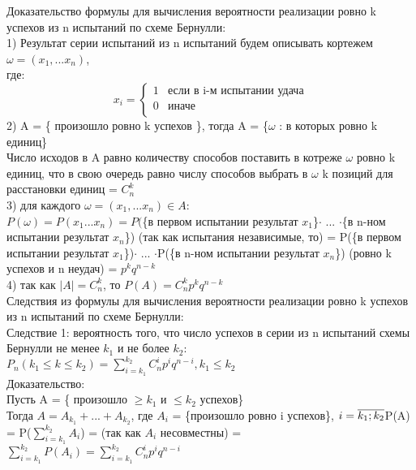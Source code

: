 Доказательство формулы для вычисления вероятности реализации ровно k успехов из n испытаний по схеме Бернулли:\\
1) Результат серии испытаний из n испытаний будем описывать кортежем $\omega = (x_{1}, ... x_{n})$,\\
где:\\
\begin{equation}
x_{i} = 
 \begin{cases}
   1 & \text{если в i-м испытании удача}\\
   0 & \text{иначе}\\
 \end{cases}
\end{equation}
2) A = \{ произошло ровно k успехов \}, тогда A = \{$\omega$ : в которых ровно k единиц\}\\
Число исходов в A равно количеству способов поставить в котреже $\omega$ ровно k единиц, что в свою очередь равно числу способов выбрать в $\omega$ k позиций для расстановки единиц = $C^{k}_{n}$\\
3) для каждого $\omega = (x_{1}, ... x_{n}) \in A$:\\
$P(\omega) = P(x_{1} ... x_{n}) = P($\{в первом испытании результат $x_{1}$\}$\cdot$ ... $\cdot$\{в n-ном испытании результат $x_{n}$\}) (так как испытания независимые, то) = P(\{в первом испытании результат $x_{1}$\})$\cdot$ ... $\cdot$P(\{в n-ном испытании результат $x_{n}$\}) (ровно k успехов и n неудач) = $p^{k} q^{n - k}$\\
4) так как $|A| = C^{k}_{n}$, то $P(A) = C^{k}_{n} p^{k} q^{n - k}$\\

Следствия из формулы для вычисления вероятности реализации ровно k успехов из n испытаний по схеме Бернулли:\\
Следствие 1: вероятность того, что число успехов в серии из n испытаний схемы Бернулли не менее $k_{1}$ и не более $k_{2}$:\\
$P_{n}(k_{1} \leqslant k \leqslant k_{2}) = \sum\limits^{k_{2}}_{i = k_{1}} C^{i}_{n} p^{i} q^{n - i}, k_{1} \leqslant k_{2}$\\
Доказательство:\\
Пусть A = \{ произошло $\geqslant k_{1}$ и $\leqslant k_{2}$ успехов\}\\
Тогда $A = A_{k_{1}} + ... + A_{k_{2}}$, где $A_{i}$ = \{произошло ровно i успехов\}, $i = \overline{k_{1}; k_{2}}\\
$P(A) = P($\sum\limits^{k_{2}}_{i = k_{1}} A_{i}$) = (так как $A_{i}$ несовместны) = $\sum\limits^{k_{2}}_{i = k_{1}} P(A_{i}) = \sum\limits^{k_{2}}_{i = k_{1}} C^{i}_{n} p^{i} q^{n - i}$\\

